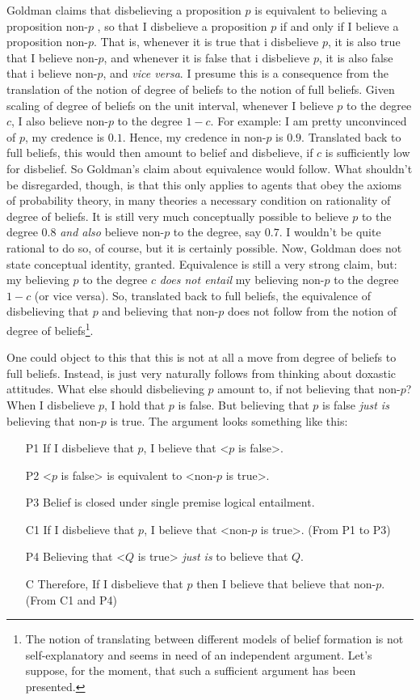 \documentclass[12pt,numbers=noenddot]{scrartcl}
\begin{document}
Goldman claims that disbelieving a proposition $p$ is equivalent to believing a proposition non-$p$ \textcite[58]{Goldman2002-GOLTUO-2}, so that I disbelieve a proposition $p$ if and only if I believe a proposition non-$p$. That is, whenever it is true that i disbelieve $p$, it is also true that I believe non-$p$, and whenever it is false that i disbelieve $p$, it is also false that i believe non-$p$, and \emph{vice versa}. I presume this is a consequence from the translation of the notion of degree of beliefs to the notion of full beliefs. Given scaling of degree of beliefs on the unit interval, whenever I believe $p$ to the degree $c$, I also believe non-$p$ to the degree $1-c$. For example: I am pretty unconvinced of $p$, my credence is $0.1$. Hence, my credence in non-$p$ is $0.9$. Translated back to full beliefs, this would then amount to belief and disbelieve, if $c$ is sufficiently low for disbelief. So Goldman's claim about equivalence would follow. What shouldn't be disregarded, though, is that this only applies to agents that obey the axioms of probability theory, in many theories a necessary condition on rationality of degree of beliefs. It is still very much conceptually possible to believe $p$ to the degree $0.8$ \emph{and also} believe non-$p$ to the degree, say $0.7$. I wouldn't be quite rational to do so, of course, but it is certainly possible. Now, Goldman does not state conceptual identity, granted. Equivalence is still a very strong claim, but: my believing $p$ to the degree $c$ \emph{does not entail} my believing non-$p$ to the degree $1-c$ (or vice versa). So, translated back to full beliefs, the equivalence of disbelieving that $p$ and believing that non-$p$ does not follow from the notion of degree of beliefs\footnote{The notion of translating between different models of belief formation is not self-explanatory and seems in need of an independent argument. Let's suppose, for the moment, that such a sufficient argument has been presented.}.

One could object to this that this is not at all a move from degree of beliefs to full beliefs. Instead, is just very naturally follows from thinking about doxastic attitudes. What else should disbelieving $p$ amount to, if not believing that non-$p$? When I disbelieve $p$, I hold that $p$ is false. But believing that $p$ is false \emph{just is} believing that non-$p$ is true. The argument looks something like this:

\begin{enumerate}
\item [P1] If I disbelieve that $p$, I believe that <$p$ is false>. 
\item [P2] <$p$ is false> is equivalent to <non-$p$ is true>.
\item [P3] Belief is closed under single premise logical entailment.
\item [C1] If I disbelieve that $p$, I believe that <non-$p$ is true>. (From P1 to P3)
\item [P4] Believing that <$Q$ is true> \emph{just is} to believe that $Q$.
\item [C] Therefore, If I disbelieve that $p$ then I believe that believe that non-$p$. (From C1 and P4)
\end{enumerate}
\end{document}
